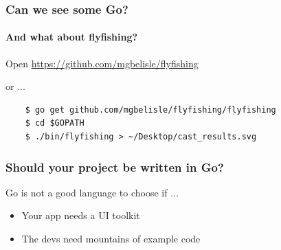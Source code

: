 \documentclass{beamer}
\begin{document}
\begin{frame}[fragile]
  \frametitle{Can we see some Go?}
  \framesubtitle{And what about flyfishing?}
  \begin{center}
    Open \url{https://github.com/mgbelisle/flyfishing}
    \bigskip

    or ...
  \end{center}  
  \begin{verbatim}
    $ go get github.com/mgbelisle/flyfishing/flyfishing
    $ cd $GOPATH
    $ ./bin/flyfishing > ~/Desktop/cast_results.svg
  \end{verbatim}
\end{frame}
\begin{frame}
  \frametitle{Should your project be written in Go?}
  Go is not a good language to choose if ...
  \begin{itemize}
    \item Your app needs a UI toolkit
    \item The devs need mountains of example code
  \end{itemize}
\end{frame}
\end{document}
